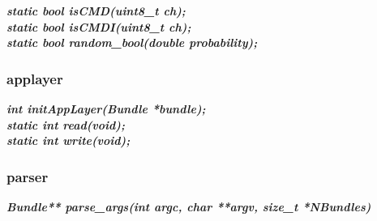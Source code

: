 \documentclass[a4paper]{article}
\begin{document}
\noindent\textbf{\textit{static bool isCMD(uint8\_t ch);}}\\

\noindent\textbf{\textit{static bool isCMDI(uint8\_t ch);}}\\

\noindent\textbf{\textit{static bool random\_bool(double probability);}}\\

\subsubsection{applayer}
\noindent\textbf{\textit{int initAppLayer(Bundle *bundle);}}\\

\noindent\textbf{\textit{static int read(void);}}\\

\noindent\textbf{\textit{static int write(void);}}\\

\subsubsection{parser}

\noindent\textbf{\textit{Bundle** parse\_args(int argc, char **argv, size\_t *NBundles)}}\\
\end{document}
